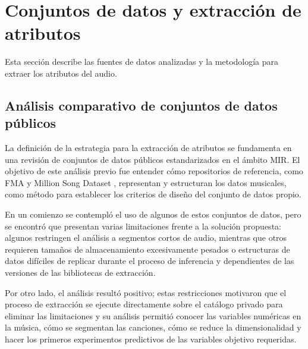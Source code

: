 \section{Conjuntos de datos y extracción de atributos}
\label{sec:conjuntos_datos}
Esta sección describe las fuentes de datos analizadas y la metodología para extraer los atributos del audio.

\subsection{Análisis comparativo de conjuntos de datos públicos}

La definición de la estrategia para la extracción de atributos se fundamenta en una revisión de conjuntos de datos públicos estandarizados en el ámbito MIR. 
El objetivo de este análisis previo fue entender cómo repositorios de referencia, como FMA y Million Song Dataset \cite{bertin2011million}, representan y estructuran los datos musicales, como método para establecer los criterios de diseño del conjunto de datos propio.

En un comienzo se contempló el uso de algunos de estos conjuntos de datos, pero se encontró que presentan varias limitaciones frente a la solución propuesta: algunos restringen el análisis a segmentos cortos de audio, mientras que otros requieren tamaños de almacenamiento excesivamente pesados o estructuras de datos difíciles de replicar durante el proceso de inferencia y dependientes de las versiones de las bibliotecas de extracción.

Por otro lado, el análisis resultó positivo; estas restricciones motivaron que el proceso de extracción se ejecute directamente sobre el catálogo privado para eliminar las limitaciones y su análisis permitió conocer las variables numéricas en la música, cómo se segmentan las canciones, cómo se reduce la dimensionalidad y hacer los primeros experimentos predictivos de las variables objetivo requeridas.

